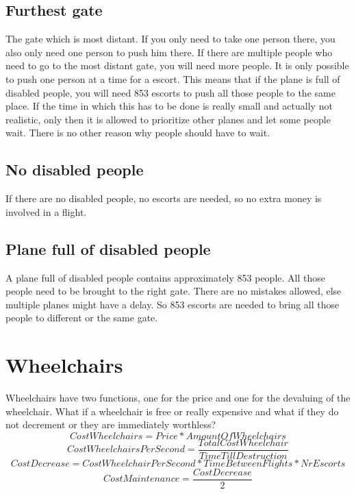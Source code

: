 \documentclass[a4paper, 11pt, notitlepage]{report}
\begin{document}
\subsection{Furthest gate}
The gate which is most distant. If you only need to take one person there, you also only need one person to push him there. If there are multiple people who need to go to the most distant gate, you will need more people. It is only possible to push one person at a time for a escort. This means that if the plane is full of disabled people, you will need 853 escorts to push all those people to the same place. If the time in which this has to be done is really small and actually not realistic, only then it is allowed to prioritize other planes and let some people wait. There is no other reason why people should have to wait.
\subsection{No disabled people}
If there are no disabled people, no escorts are needed, so no extra money is involved in a flight.
\subsection{Plane full of disabled people}
A plane full of disabled people contains approximately 853 people. All those people need to be brought to the right gate. There are no mistakes allowed, else multiple planes might have a delay. So 853 escorts are needed to bring all those people to different or the same gate.
\section{Wheelchairs}
Wheelchairs have two functions, one for the price and one for the devaluing of the wheelchair. What if a wheelchair is free or really expensive and what if they do not decrement or they are immediately worthless?\\
\begin{equation}
CostWheelchairs = Price * AmountOfWheelchairs
\end{equation}
\begin{equation}
CostWheelchairsPerSecond = \frac{TotalCostWheelchair}{TimeTillDestruction}
\end{equation}
\begin{equation}
CostDecrease = CostWheelchairPerSecond * TimeBetweenFlights * NrEscorts
\end{equation}
\begin{equation}
CostMaintenance = \frac{CostDecrease}{2}
\end{equation}
\end{document}
